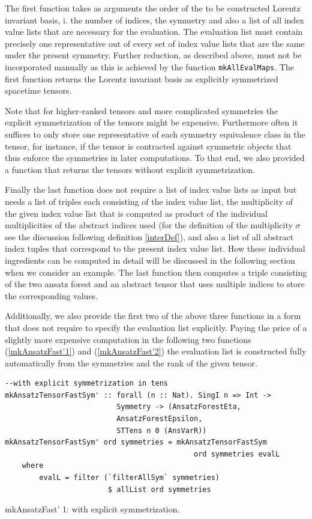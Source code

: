 \documentclass[a4paper,12pt, DIV=14, BCOR=5mm, twoside, headsepline, numbers=noenddot]{scrbook}
\begin{document}
The first function takes as arguments the order of the to be constructed Lorentz invariant basis, i. the number of indices, the symmetry and also a list of all index value lists that are necessary for the evaluation. The evaluation list must contain precisely one representative out of every set of index value lists that are the same under the present symmetry. Further reduction, as described above, must not be incorporated manually as this is achieved by the function \texttt{mkAllEvalMaps}.
The first function returns the Lorentz invariant basis as explicitly symmetrized spacetime tensors.

Note that for higher-ranked tensors and more complicated symmetries the explicit symmetrization of the tensors might be expensive. Furthermore often it suffices to only store one representative of each symmetry equivalence class in the tensor, for instance, if the tensor is contracted against symmetric objects that thus enforce the symmetries in later computations. To that end, we also provided a function that returns the tensors without explicit symmetrization.

Finally the last function does not require a list of index value lists as input but needs a list of triples each consisting of the index value list, the multiplicity of the given index value list that is computed as product of the individual multiplicities of the abstract indices used (for the definition of the multiplicity $\sigma$ see the discussion following definition \ref{interDef}), and also a list of all abstract index tuples that correspond to the present index value list. How these individual ingredients can be computed in detail will be discussed in the following section when we consider an example. The last function then computes a triple consisting of the two ansatz forest and an abstract tensor that uses multiple indices to store the corresponding values. 

Additionally, we also provide the first two of the above three functions in a form that does not require to specify the evaluation list explicitly. Paying the price of a slightly more expensive computation in the following two functions (\ref{mkAnsatzFast'1}) and (\ref{mkAnsatzFast'2}) the evaluation list is constructed fully automatically from the symmetries and the rank of the given tensor.

\begin{listing}[hbt!]
\begin{verbatim}
--with explicit symmetrization in tens
mkAnsatzTensorFastSym' :: forall (n :: Nat). SingI n => Int ->
                          Symmetry -> (AnsatzForestEta,
                          AnsatzForestEpsilon,
                          STTens n 0 (AnsVarR))
mkAnsatzTensorFastSym' ord symmetries = mkAnsatzTensorFastSym
                                            ord symmetries evalL
    where
        evalL = filter (`filterAllSym` symmetries) 
                        $ allList ord symmetries
\end{verbatim} 
\caption{mkAnsatzFast' 1: with explicit symmetrization.}\label{mkAnsatzFast'1}
\end{listing}
\end{document}
